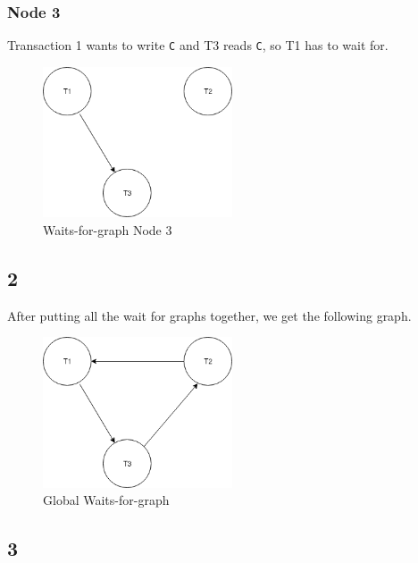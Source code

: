 \subsubsection{Node 3}
Transaction 1 wants to write \texttt{C} and T3 reads \texttt{C}, so T1 has to wait for.
\begin{figure}[htb!]
	\center
	\includegraphics[width=0.5\textwidth]{img/Node3}
	\caption{Waits-for-graph Node 3}
\end{figure}


\subsection{2}
After putting all the wait for graphs together, we get the following graph.

\begin{figure}[htb!]
	\center
	\includegraphics[width=0.5\textwidth]{img/Globalgraph}
	\caption{Global Waits-for-graph}
\end{figure}

\subsection{3}